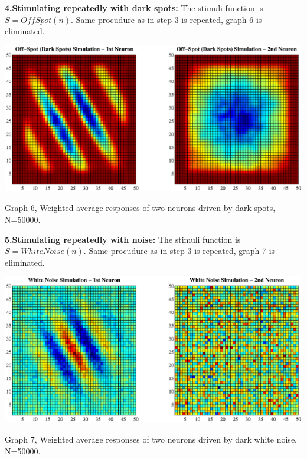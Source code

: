 \documentclass{article}
\begin{document}
\setcounter{tocdepth}{1}
\textbf{4.Stimulating repeatedly with dark spots:} The stimuli function is $S=OffSpot(n)$. Same procudure as in step 3 is repeated, graph 6 is eliminated.

\begin{center}
 \includegraphics[width=\textwidth]{offspot.eps}
\begin{footnotesize}Graph 6, Weighted average responses of two neurons driven by dark spots, N=50000. \end{footnotesize}
\end{center}

\setcounter{tocdepth}{1}
\textbf{5.Stimulating repeatedly with noise:} The stimuli function is $S=WhiteNoise(n)$. Same procudure as in step 3 is repeated, graph 7 is eliminated.

\begin{center}
 \includegraphics[width=\textwidth]{whitenoise.eps}
\begin{footnotesize}Graph 7, Weighted average responses of two neurons driven by dark white noise, N=50000. \end{footnotesize}
\end{center}
\end{document}
